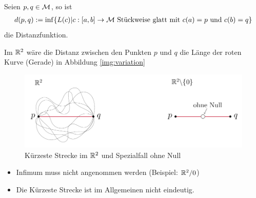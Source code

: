\begin{defs}[Distanzfunktion]
    Seien $p, q \in \mathcal{M}$, so ist
    \begin{align}
        \label{eq:distanzfuntion}
        d(p,q) := \inf \{ L(c) \vert c : [a, b]\to \mfk \ \text{Stückweise glatt mit} \ c(a) = p \ \text{und} \ c(b) = q \}
    \end{align}
    die Distanzfunktion.
\end{defs}
\begin{bsp}
Im $\mathbb{R}^2$ wäre die Distanz zwischen den Punkten $p$ und $q$ die Länge der roten Kurve (Gerade) in Abbildung \ref{img:variation}
\begin{figure}[H]
\centering
\includegraphics[width=0.8\linewidth]{figures/tikz/variation_straightline.pdf}
\caption{Kürzeste Strecke im $\mathbb{R}^2$ und Spezialfall ohne Null}
\label{img:variation_straightline}
\end{figure} 
\end{bsp}


\begin{bem}\leavevmode
    \begin{itemize}
        \item Infimum muss nicht angenommen werden (Beispiel: $\mathbb{R}^2 / 0 $)
        \item Die Kürzeste Strecke ist im Allgemeinen nicht eindeutig.
     \end{itemize}
 \end{bem}
